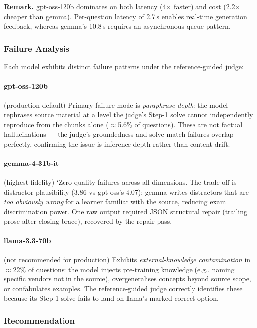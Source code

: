 \textbf{Remark.} gpt-oss-120b dominates on both latency (4$\times$ faster) and cost (2.2$\times$ cheaper than gemma). Per-question latency of 2.7\,s enables real-time generation feedback, whereas gemma's 10.8\,s requires an asynchronous queue pattern.

\subsubsection{Failure Analysis}

Each model exhibits distinct failure patterns under the reference-guided judge:

\paragraph{gpt-oss-120b} (production default)
Primary failure mode is \textit{paraphrase-depth}: the model rephrases source material at a level the judge's Step-1 solve cannot independently reproduce from the chunks alone ($\approx$5.6\% of questions). These are not factual hallucinations --- the judge's groundedness and solve-match failures overlap perfectly, confirming the issue is inference depth rather than content drift.

\paragraph{gemma-4-31b-it} (highest fidelity)
`Zero quality failures across all dimensions. The trade-off is distractor plausibility (3.86 vs gpt-oss's 4.07): gemma writes distractors that are \textit{too obviously wrong} for a learner familiar with the source, reducing exam discrimination power. One raw output required JSON structural repair (trailing prose after closing brace), recovered by the repair pass.

\paragraph{llama-3.3-70b} (not recommended for production)
Exhibits \textit{external-knowledge contamination} in $\approx$22\% of questions: the model injects pre-training knowledge (e.g., naming specific vendors not in the source), overgeneralises concepts beyond source scope, or confabulates examples. The reference-guided judge correctly identifies these because its Step-1 solve fails to land on llama's marked-correct option.

\subsubsection{Recommendation}

